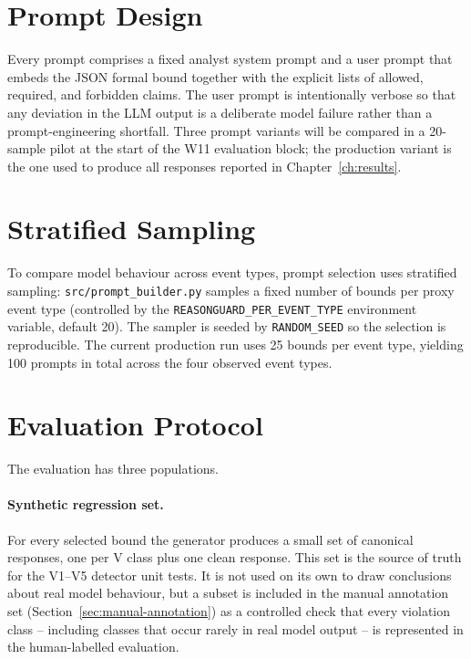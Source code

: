 \section{Prompt Design}
\label{sec:prompts}

Every prompt comprises a fixed analyst system prompt and a user prompt that
embeds the JSON formal bound together with the explicit lists of allowed,
required, and forbidden claims. The user prompt is intentionally verbose so
that any deviation in the LLM output is a deliberate model failure rather
than a prompt-engineering shortfall. Three prompt variants will be compared
in a 20-sample pilot at the start of the W11 evaluation block; the
production variant is the one used to produce all responses reported in
Chapter~\ref{ch:results}.

\section{Stratified Sampling}
\label{sec:stratified-sampling}

To compare model behaviour across event types, prompt selection uses
stratified sampling: \texttt{src/prompt\_builder.py} samples a fixed number
of bounds per proxy event type (controlled by the
\texttt{REASONGUARD\_PER\_EVENT\_TYPE} environment variable, default 20).
The sampler is seeded by \texttt{RANDOM\_SEED} so the selection is
reproducible. The current production run uses 25 bounds per event type,
yielding 100 prompts in total across the four observed event types.

\section{Evaluation Protocol}
\label{sec:protocol}

The evaluation has three populations.

\paragraph{Synthetic regression set.}
For every selected bound the generator produces a small set of canonical
responses, one per V class plus one clean response. This set is the source
of truth for the V1--V5 detector unit tests. It is not used on its own to
draw conclusions about real model behaviour, but a subset is included in the
manual annotation set (Section~\ref{sec:manual-annotation}) as a controlled
check that every violation class -- including classes that occur rarely in
real model output -- is represented in the human-labelled evaluation.

